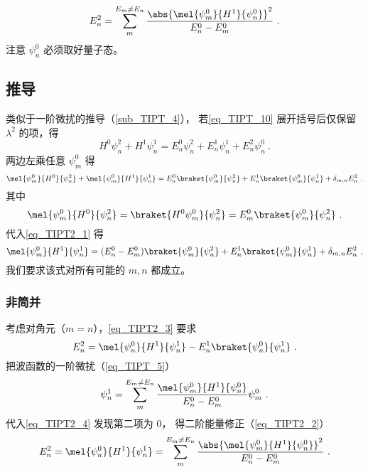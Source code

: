 
\begin{issues}
\issueDraft
\end{issues}


\begin{equation}\label{eq_TIPT2_2}
E_n^2 = \sum_{m}^{E_m\ne E_n} \frac{\abs{\mel{\psi_m^0}{H^1}{\psi_n^0}}^2}{E_n^0-E_m^0}~.
\end{equation}
注意 $\psi_n^0$ 必须取好量子态。

\subsection{推导}
类似于一阶微扰的推导（\autoref{sub_TIPT_4}）， 若\autoref{eq_TIPT_10} 展开括号后仅保留 $\lambda^2$ 的项，得
\begin{equation}
H^0\psi_n^2 + H^1\psi_n^1 = E_n^0\psi_n^2 + E_n^1\psi_n^1 + E_n^2\psi_n^0~.
\end{equation}
两边左乘任意 $\psi_m^0$ 得
\begin{equation}\label{eq_TIPT2_1}
\mel{\psi_m^0}{H^0}{\psi_n^2} + \mel{\psi_m^0}{H^1}{\psi_n^1} = E_n^0\braket{\psi_m^0}{\psi_n^2} + E_n^1\braket{\psi_m^0}{\psi_n^1} + \delta_{m,n}E_n^2~.
\end{equation}
其中
\begin{equation}
\mel{\psi_m^0}{H^0}{\psi_n^2} = \braket{H^0\psi_m^0}{\psi_n^2} = E_m^0\braket{\psi_m^0}{\psi_n^2}~.
\end{equation}
代入\autoref{eq_TIPT2_1} 得
\begin{equation}\label{eq_TIPT2_3}
\mel{\psi_m^0}{H^1}{\psi_n^1} = (E_n^0-E_m^0)\braket{\psi_m^0}{\psi_n^2} + E_n^1\braket{\psi_m^0}{\psi_n^1} + \delta_{m,n}E_n^2~.
\end{equation}
我们要求该式对所有可能的 $m,n$ 都成立。

\subsubsection{非简并}
考虑对角元（$m=n$），\autoref{eq_TIPT2_3} 要求
\begin{equation}\label{eq_TIPT2_4}
E_n^2 = \mel{\psi_n^0}{H^1}{\psi_n^1} - E_n^1\braket{\psi_n^0}{\psi_n^1}~.
\end{equation}
把波函数的一阶微扰（\autoref{eq_TIPT_5}）
\begin{equation}\label{eq_TIPT2_6}
\psi_n^1 = \sum_m^{E_m\ne E_n} \frac{\mel{\psi_m^0}{H^1}{\psi_n^0}}{E_n^0 - E_m^0}\psi_m^0~.
\end{equation}
代入\autoref{eq_TIPT2_4} 发现第二项为 0， 得二阶能量修正（\autoref{eq_TIPT2_2}）
\begin{equation}\label{eq_TIPT2_5}
E_n^2 = \mel{\psi_n^0}{H^1}{\psi_n^1} = \sum_{m}^{E_m\ne E_n} \frac{\abs{\mel{\psi_m^0}{H^1}{\psi_n^0}}^2}{E_n^0-E_m^0}~.
\end{equation}

